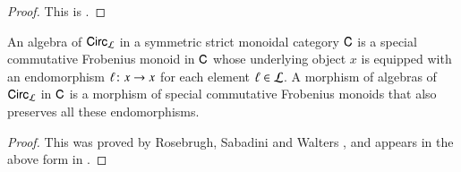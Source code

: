 \documentclass[reqno]{amsart}
\begin{document}
\begin{proof}
This is \cite[Proposition 4.3]{BCR}.
\end{proof}

\begin{prop} 
\label{prop:LCirc_algebra}
An algebra of $\mathsf{Circ}_{\mathcal{L}}$ in a symmetric strict monoidal category $\mathsf{C}$ is a 
special commutative Frobenius monoid in $\mathsf{C}$ whose underlying object $x$ is equipped
with an endomorphism $\ell \colon x \to x$ for each element $\ell \in \mathcal{L}$. 
A morphism of algebras of $\mathsf{Circ}_{\mathcal{L}}$ in $\mathsf{C}$ is a morphism of special commutative Frobenius monoids that also preserves all these endomorphisms.
\end{prop}

\begin{proof}
This was proved by Rosebrugh, Sabadini and Walters \cite{RSW}, and appears
in the above form in \cite[Proposition 7.2]{BCR}.  
\end{proof}
\end{document}
